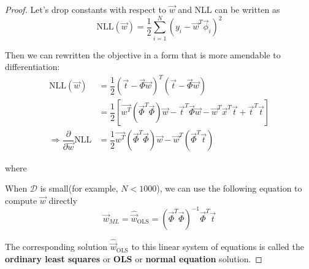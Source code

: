 \begin{proof}
Let's drop constants with respect to $\vec{w}$ and NLL can be written as
\begin{equation}
\text{NLL}(\vec{w}) = \dfrac{1}{2}\sum\limits_{i=1}^N (y_i-\vec{w}^T\vec{\phi}_i)^2
\end{equation}

Then we can rewritten the objective in a form that is more amendable to differentiation:
\begin{align}
\text{NLL}(\vec{w}) &= \dfrac{1}{2}(\vec{t}-\vec{\Phi}\vec{w})^T(\vec{t}-\vec{\Phi}\vec{w})\\
&= \dfrac{1}{2} [\vec{w^T} (\vec{\Phi}^T\vec{\Phi})\vec{w} - \vec{t}^T\vec{\Phi}\vec{w}- \vec{w}^T\vec{x}^T\vec{t}  +\vec{t}^T\vec{t}]			\\
\Rightarrow
\dfrac{\partial}{\partial \vec{w}}\text{NLL} &= \dfrac{1}{2} \vec{w^T} (\vec{\Phi}^T\vec{\Phi})\vec{w} -\vec{w}^T(\vec{\Phi}^T\vec{t}) 
\end{align}

where




When $\mathcal{D}$ is small(for example, $N < 1000$), we can use the following equation to compute $\vec{w}$ directly
\begin{equation}
\vec{w}_{ML}=\hat{\vec{w}}_{\mathrm{OLS}}=(\vec{\Phi}^T\vec{\Phi})^{-1}\vec{\Phi}^T\vec{t}
\end{equation}

The corresponding solution $\hat{\vec{w}}_{\mathrm{OLS}}$ to this linear system of equations is called the \textbf{ordinary least squares} or \textbf{OLS} or \textbf{normal equation} solution.
\end{proof}


